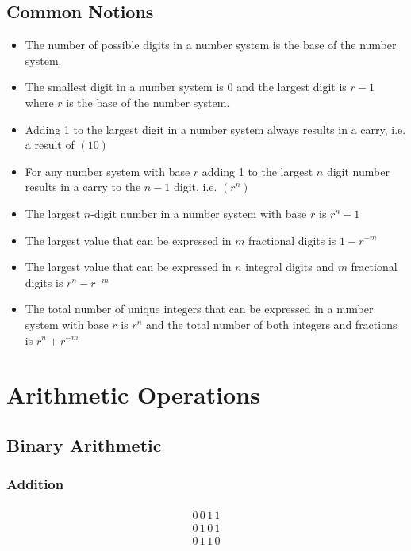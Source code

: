 \documentclass[12pt letter]{report}
\begin{document}
\section{Common Notions}

\begin{itemize}
  \item The number of possible digits in a number system is the base of the number system.
  \item The smallest digit in a number system is 0 and the largest digit is $r-1$ where $r$ is the base of the number system.
  \item Adding 1 to the largest digit in a number system always results in a carry, i.e. a result of $ \left( 10 \right) $
  \item For any number system with base $r$ adding 1 to the largest $n$ digit number results in a carry to the $n-1$
        digit, i.e. $ \left( r^{n} \right) $
  \item  The largest $n$-digit number in a number system with base $r$ is $r^{n} - 1$
  \item The largest value that can be expressed in $m$ fractional digits is $1 - r^{-m}$
  \item The largest value that can be expressed in $n$ integral digits and $m$ fractional digits is $r^{n} - r^{-m}$
  \item The total number of unique integers that can be expressed in a number system with base $r$ is $r^{n}$ and
        the total number of both integers and fractions is $r^{n} + r^{-m}$
\end{itemize}

\chapter{Arithmetic Operations}

\section{Binary Arithmetic}

\subsection{Addition}


\begin{align*}
  \begin{split}
    0\,0\,1\,1 \\
    0\,1\,0\,1 \\
    \hline
    0\,1\,1\,0
  \end{split}
\end{align*}
\end{document}
